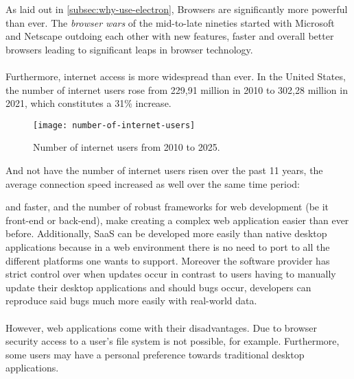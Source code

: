 
As laid out in \ref{subsec:why-use-electron}, Browsers are significantly more powerful than ever. 
The \emph{browser wars} of the mid-to-late nineties started with Microsoft and Netscape outdoing each other with
new features, faster and overall better browsers leading to significant leaps in browser technology. \parencite{mozilla2021}\paragraph{}
Furthermore, internet access is more widespread than ever.
In the United States, the number of internet users rose from 229,91 million in 2010 to 302,28 million in 2021,
which constitutes a 31\% increase.\par
\begin{figure}[H]
    \label{fig:num-of-internet-users}
    \caption{Number of internet users from 2010 to 2025. \parencite{statista2021}}
    \texttt{[image: number-of-internet-users]}
\end{figure}
And not have the number of internet users risen over the past 11 years, the average connection speed increased as well
over the same time period:

and faster, and the number
of robust frameworks for web development (be it front-end or back-end), make creating a complex web application easier
than ever before. \parencite{akamai2017, statista2021}
Additionally, SaaS can be developed more easily than native desktop applications because in a web environment there is no
need to port to all the different platforms one wants to support. 
Moreover the software provider has strict control over when updates occur in contrast to users having to manually update their 
desktop applications and should bugs occur, developers can reproduce said bugs much more easily with real-world data. \parencite{jacobs2005}\paragraph{}
However, web applications come with their disadvantages. Due to browser security access to a user's file system is not possible, for example.
Furthermore, some users may have a personal preference towards traditional desktop applications. 
